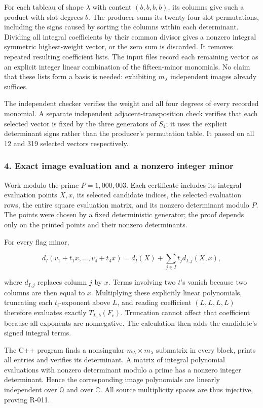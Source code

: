 \documentclass[
  10pt,
]{article}
\begin{document}
For each tableau of shape \(\lambda\) with content \((b,b,b,b)\), its
columns give such a product with slot degrees \(b\). The producer sums
its twenty-four slot permutations, including the signs caused by sorting
the columns within each determinant. Dividing all integral coefficients
by their common divisor gives a nonzero integral symmetric
highest-weight vector, or the zero sum is discarded. It removes repeated
resulting coefficient lists. The input files record each remaining
vector as an explicit integer linear combination of the fifteen-minor
monomials. No claim that these lists form a basis is needed: exhibiting
\(m_\lambda\) independent images already suffices.

The independent checker verifies the weight and all four degrees of
every recorded monomial. A separate independent adjacent-transposition
check verifies that each selected vector is fixed by the three
generators of \(S_4\); it uses the explicit determinant signs rather
than the producer's permutation table. It passed on all 12 and 319
selected vectors respectively.

\subsubsection{4. Exact image evaluation and a nonzero integer
minor}\label{exact-image-evaluation-and-a-nonzero-integer-minor}

Work modulo the prime \(P=1,000,003\). Each certificate includes its
integral evaluation points \(X,x\), its selected candidate indices, the
selected evaluation rows, the entire square evaluation matrix, and its
nonzero determinant modulo \(P\). The points were chosen by a fixed
deterministic generator; the proof depends only on the printed points
and their nonzero determinants.

For every flag minor,

\[
 d_I(v_1+t_1x,\ldots,v_4+t_4x)
 =d_I(X)+\sum_{j\in I}t_jd_{I,j}(X,x),
\]

where \(d_{I,j}\) replaces column \(j\) by \(x\). Terms involving two
\(t\)'s vanish because two columns are then equal to \(x\). Multiplying
these explicitly linear polynomials, truncating each \(t_i\)-exponent
above \(L\), and reading coefficient \((L,L,L,L)\) therefore evaluates
exactly \(T_{L,b}(F_c)\). Truncation cannot affect that coefficient
because all exponents are nonnegative. The calculation then adds the
candidate's signed integral terms.

The C++ program finds a nonsingular \(m_\lambda\times m_\lambda\)
submatrix in every block, prints all entries and verifies its
determinant. A matrix of integral polynomial evaluations with nonzero
determinant modulo a prime has a nonzero integer determinant. Hence the
corresponding image polynomials are linearly independent over
\(\mathbb Q\) and over \(\mathbb C\). All source multiplicity spaces are
thus injective, proving R-011.
\end{document}

